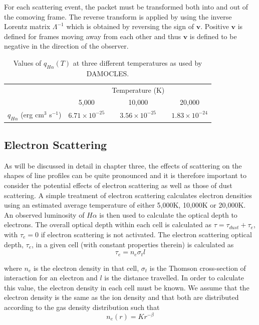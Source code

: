 For each scattering event, the packet must be transformed both into and out of the comoving frame. The reverse transform is applied by using the inverse Lorentz matrix $\Lambda^{-1}$ which is obtained by reversing the sign of $\boldsymbol{v}$.  Positive $\boldsymbol{v}$ is defined for frames moving away from each other and thus $\boldsymbol{v}$ is defined to be negative in the direction of the observer.

\begin{table}[htdp]
\caption{Values of $q_{H\alpha}(T)$ at three different temperatures as used by DAMOCLES.}
\begin{center}
\def\arraystretch{1.5}
\begin{tabular}{ c c c c}
\toprule
&&Temperature (K) & \\
\cmidrule{2-4}
& 5,000 & 10,000 & 20,000  \\
\midrule
$q_{H\alpha}$ (erg cm$^3$ s$^{-1}$)  & $6.71\times 10^{-25}$	&$3.56\times 10^{-25}$	&$1.83\times 10^{-24}$  \\
\bottomrule
\end{tabular}
\end{center}
\label{tb:q}
        \end{table}%

        \subsection{Electron Scattering}
        \label{scn:ES}

        As will be discussed in detail in chapter three, the effects of scattering on the shapes of line profiles can be quite pronounced and it is therefore important to consider the potential effects of electron scattering as well as those of dust scattering.  A simple treatment of electron scattering calculates electron densities using an estimated average temperature of either 5,000K, 10,000K or 20,000K.  An observed luminosity of $H{\alpha}$ is then used to calculate the optical depth to electrons.  The overall optical depth within each cell is calculated as $\tau = \tau_{dust}+\tau_{e}$, with $\tau_{e}=0$ if electron scattering is not activated.  The electron scattering optical depth, $\tau_e$, in a given cell (with constant properties therein) is calculated as 
        \begin{equation}
        \tau_e =  n_e \sigma_t l
        \end{equation}
        
        \noindent where $n_e$ is the electron density in that cell,  $\sigma_t$ is the Thomson cross-section of interaction for an electron and $l$ is the distance travelled.	
        In order to calculate this value, the electron density in each cell must be known.  We assume that the electron density is the same as the ion density and that both are distributed according to the gas density distribution such that 
        \begin{equation}
        \label{eqn:es_distn}
        n_e(r) = Kr^{-\beta}
        \end{equation}

